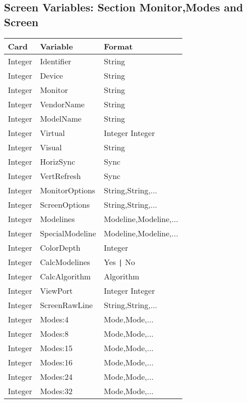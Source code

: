 \subsection{Screen Variables: Section Monitor,Modes and Screen}
\begin{tabular}[h]{|p{2cm}|p{4cm}|p{7cm}|}
 \hline
 \textbf{Card} & \textbf{Variable}     & \textbf{Format}        \\
 \hline
 Integer & Identifier       & String                             \\  
 Integer & Device           & String                             \\
 Integer & Monitor          & String                             \\
 Integer & VendorName       & String                             \\
 Integer & ModelName        & String                             \\
 Integer & Virtual          & Integer Integer                    \\
 Integer & Visual           & String                             \\
 Integer & HorizSync        & Sync                               \\
 Integer & VertRefresh      & Sync                               \\
 Integer & MonitorOptions   & String,String,...                  \\
 Integer & ScreenOptions    & String,String,...                  \\
 Integer & Modelines        & Modeline,Modeline,...              \\
 Integer & SpecialModeline  & Modeline,Modeline,...              \\
 Integer & ColorDepth       & Integer                            \\
 Integer & CalcModelines    & Yes \verb+|+ No                    \\
 Integer & CalcAlgorithm    & Algorithm                          \\
 Integer & ViewPort         & Integer Integer                    \\
 Integer & ScreenRawLine    & String,String,...                  \\
 Integer & Modes:4          & Mode,Mode,...                      \\
 Integer & Modes:8          & Mode,Mode,...                      \\
 Integer & Modes:15         & Mode,Mode,...                      \\
 Integer & Modes:16         & Mode,Mode,...                      \\
 Integer & Modes:24         & Mode,Mode,...                      \\
 Integer & Modes:32         & Mode,Mode,...                      \\
 \hline
\end{tabular}


